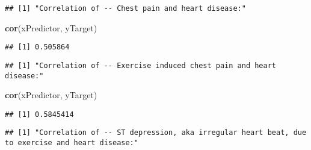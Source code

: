 \documentclass[]{article}
\newenvironment{Shaded}{\begin{snugshade}}{\end{snugshade}}
\newcommand{\KeywordTok}[1]{\textcolor[rgb]{0.13,0.29,0.53}{\textbf{#1}}}
\newcommand{\StringTok}[1]{\textcolor[rgb]{0.31,0.60,0.02}{#1}}
\newcommand{\OperatorTok}[1]{\textcolor[rgb]{0.81,0.36,0.00}{\textbf{#1}}}
\newcommand{\NormalTok}[1]{#1}
\begin{document}
\begin{verbatim}
## [1] "Correlation of -- Chest pain and heart disease:"
\end{verbatim}

\begin{Shaded}
\begin{Highlighting}[]
\KeywordTok{cor}\NormalTok{(xPredictor, yTarget)}
\end{Highlighting}
\end{Shaded}

\begin{verbatim}
## [1] 0.505864
\end{verbatim}

\begin{Shaded}
\end{Shaded}

\begin{verbatim}
## [1] "Correlation of -- Exercise induced chest pain and heart disease:"
\end{verbatim}

\begin{Shaded}
\begin{Highlighting}[]
\KeywordTok{cor}\NormalTok{(xPredictor, yTarget)}
\end{Highlighting}
\end{Shaded}

\begin{verbatim}
## [1] 0.5845414
\end{verbatim}

\begin{Shaded}
\end{Shaded}

\begin{verbatim}
## [1] "Correlation of -- ST depression, aka irregular heart beat, due to exercise and heart disease:"
\end{verbatim}
\end{document}
